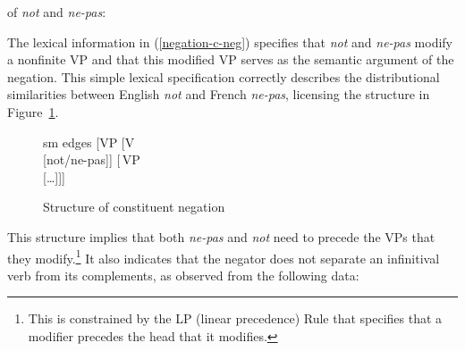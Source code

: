 \documentclass[output=paper
                ,modfonts
                ,nonflat
	        ,collection
	        ,collectionchapter
	        ,collectiontoclongg
 	        ,biblatex
                ,babelshorthands
                ,newtxmath
                ,draftmode
                ,colorlinks, citecolor=brown
]{./langsci/langscibook}
\begin{document}
{\begin{exe}
\begin{xlist}
\begin{exe}
\begin{xlist}
\ea
\label{negation-c-neg}
\localvs of \emph{not} and \emph{ne-pas}:\\
\z


\noindent %
The lexical information in (\ref{negation-c-neg}) specifies that
\textit{not} and \textit{ne-pas} modify a nonfinite VP and that this
modified VP serves as the semantic argument of the negation.
This simple lexical specification correctly describes the
distributional similarities between English \textit{not} and French
\textit{ne-pas}, licensing the structure in Figure~\ref{negation-not-vp-mod}.

\begin{figure}
	\begin{forest}
		sm edges
		[VP
			[V\\
					[not/ne-pas]]
			[\,VP\\
					[\ldots]]]
	\end{forest}
\caption{Structure of constituent negation}\label{negation-not-vp-mod}
\end{figure}
\noindent
This structure implies that 
both \textit{ne-pas} and \textit{not} need to precede the VPs that they modify.\footnote{
This is constrained by the LP (linear precedence) Rule that specifies
that a modifier precedes the head that it modifies.}  It also 
indicates that the negator does not separate an infinitival verb
from its complements, as observed from the following data:


\end{xlist}
\end{exe}
\end{xlist}
\end{exe}}
\end{document}
